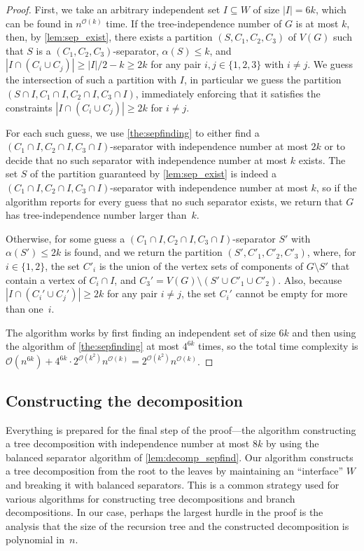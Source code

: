 \documentclass[11pt]{article}
\theoremstyle{definition}
\newcommand{\OO}{\mathcal{O}}
\begin{document}
\begin{proof}
First, we take an arbitrary independent set $I \subseteq W$ of size $|I| = 6k$, which can be found in $n^{\OO(k)}$ time.
If the tree-independence number of $G$ is at most $k$, then, by \cref{lem:sep_exist}, there exists a partition $(S, C_1, C_2, C_3)$ of $V(G)$ such that $S$ is a $(C_1,C_2,C_3)$-separator, $\alpha(S) \le k$, and $|I \cap (C_i \cup C_j)| \ge |I|/2-k \ge 2k$ for any pair $i,j \in \{1,2,3\}$ with $i \neq j$.
We guess the intersection of such a partition with $I$, in particular we guess the partition $(S \cap I, C_1 \cap I, C_2 \cap I, C_3 \cap I)$, immediately enforcing that it satisfies the constraints $|I \cap (C_i \cup C_j)| \ge 2k$ for $i \neq j$.


For each such guess, we use \cref{the:sepfinding} to either find a $(C_1 \cap I, C_2 \cap I, C_3 \cap I)$-separator with independence number at most $2k$ or to decide that no such separator with independence number at most $k$ exists.
The set $S$ of the partition guaranteed by \cref{lem:sep_exist} is indeed a $(C_1 \cap I, C_2 \cap I, C_3 \cap I)$-separator with independence number at most $k$, so if the algorithm reports for every guess that no such separator exists, we return that $G$ has tree-independence number larger than~$k$.

Otherwise, for some guess a $(C_1 \cap I, C_2 \cap I, C_3 \cap I)$-separator $S'$ with $\alpha(S') \le 2k$ is found, and we return the partition $(S', C'_1, C'_2, C'_3)$, where, for $i\in \{1,2\}$, the set $C'_i$ is the union of the vertex sets of components of $G \setminus S'$ that contain a vertex of $C_i \cap I$, and $C_3' = V(G) \setminus (S'\cup C'_1 \cup C'_2)$.
Also, because $|I \cap (C_i' \cup C_j')| \ge 2k$ for any pair $i \neq j$, the set $C_i'$ cannot be empty for more than one~$i$.


The algorithm works by first finding an independent set of size $6k$ and then using the algorithm of \cref{the:sepfinding} at most $4^{6k}$ times, so the total time complexity is $\OO(n^{6k}) + 4^{6k} \cdot 2^{\OO(k^2)} n^{\OO(k)} = 2^{\OO(k^2)} n^{\OO(k)}$.
\end{proof}


\subsection{Constructing the decomposition}\label{subsec:constructing}

Everything is prepared for the final step of the proof---the algorithm constructing a tree decomposition with independence number at most $8k$ by using the balanced separator algorithm of \cref{lem:decomp_sepfind}.
Our algorithm constructs a tree decomposition from the root to the leaves by maintaining an ``interface'' $W$ and breaking it with balanced separators.
This is a common strategy used for various algorithms for constructing tree decompositions and branch decompositions.
In our case, perhaps the largest hurdle in the proof is the analysis that the size of the recursion tree and the constructed decomposition is polynomial in~$n$.
\end{document}
